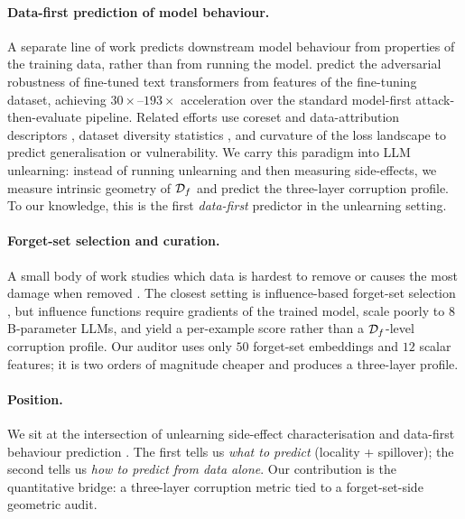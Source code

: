 \paragraph{Data-first prediction of model behaviour.}
A separate line of work predicts downstream model behaviour from properties of the training data, rather than from running the model. \citet{dang2024curious} predict the adversarial robustness of fine-tuned text transformers from features of the fine-tuning dataset, achieving $30\!\times\!\text{--}\!193\times$ acceleration over the standard model-first attack-then-evaluate pipeline. Related efforts use coreset and data-attribution descriptors \citep{koh2017understanding, ilyas2022datamodels}, dataset diversity statistics \citep{wang2024data}, and curvature of the loss landscape \citep{yao2020pyhessian} to predict generalisation or vulnerability. We carry this paradigm into LLM unlearning: instead of running unlearning and then measuring side-effects, we measure intrinsic geometry of $\mathcal{D}_f$ and predict the three-layer corruption profile. To our knowledge, this is the first \emph{data-first} predictor in the unlearning setting.

\paragraph{Forget-set selection and curation.}
A small body of work studies which data is hardest to remove or causes the most damage when removed \citep{thudi2022unrolling, kurmanji2024towards}. The closest setting is influence-based forget-set selection \citep{koh2017understanding}, but influence functions require gradients of the trained model, scale poorly to $8$B-parameter LLMs, and yield a per-example score rather than a $\mathcal{D}_f$-level corruption profile. Our auditor uses only $50$ forget-set embeddings and $12$ scalar features; it is two orders of magnitude cheaper and produces a three-layer profile.

\paragraph{Position.}
We sit at the intersection of unlearning side-effect characterisation \citep{ko2025probing} and data-first behaviour prediction \citep{dang2024curious}. The first tells us \emph{what to predict} (locality + spillover); the second tells us \emph{how to predict from data alone}. Our contribution is the quantitative bridge: a three-layer corruption metric tied to a forget-set-side geometric audit.
